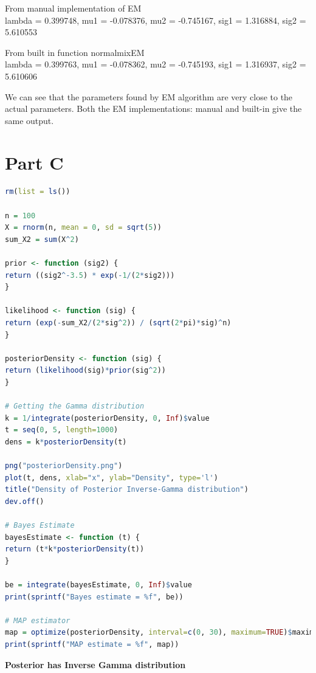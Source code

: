 \documentclass{article}
\begin{document}
From manual implementation of EM\\
lambda = 0.399748, mu1 = -0.078376, mu2 = -0.745167, sig1 = 1.316884, sig2 = 5.610553

From built in function normalmixEM\\
lambda = 0.399763, mu1 = -0.078362, mu2 = -0.745193, sig1 = 1.316937, sig2 = 5.610606

We can see that the parameters found by EM algorithm are very close to the actual parameters. Both the EM implementations: manual and built-in give the same output.
\pagebreak

\section{Part C}


\begin{lstlisting}[language=R]
rm(list = ls())

n = 100
X = rnorm(n, mean = 0, sd = sqrt(5))
sum_X2 = sum(X^2)

prior <- function (sig2) {
return ((sig2^-3.5) * exp(-1/(2*sig2)))
}

likelihood <- function (sig) {
return (exp(-sum_X2/(2*sig^2)) / (sqrt(2*pi)*sig)^n)
}

posteriorDensity <- function (sig) {
return (likelihood(sig)*prior(sig^2))
}

# Getting the Gamma distribution
k = 1/integrate(posteriorDensity, 0, Inf)$value
t = seq(0, 5, length=1000)
dens = k*posteriorDensity(t)

png("posteriorDensity.png")
plot(t, dens, xlab="x", ylab="Density", type='l')
title("Density of Posterior Inverse-Gamma distribution")
dev.off()

# Bayes Estimate
bayesEstimate <- function (t) {
return (t*k*posteriorDensity(t))
}

be = integrate(bayesEstimate, 0, Inf)$value
print(sprintf("Bayes estimate = %f", be))

# MAP estimator
map = optimize(posteriorDensity, interval=c(0, 30), maximum=TRUE)$maximum
print(sprintf("MAP estimate = %f", map))
\end{lstlisting}

\pagebreak
\textbf{Posterior has Inverse Gamma distribution}
\end{document}

